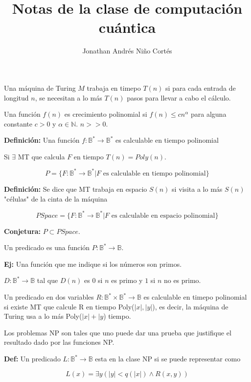 \documentclass[letter,twoside,12pt]{article}
\title{Notas de la clase de computación cuántica}
\author{Jonathan Andrés Niño Cortés}
\begin{document}
\maketitle

Una máquina de Turing $ M $ trabaja en timepo $ T(n) $ si para cada entrada de longitud $ n $, se necesitan a lo más $ T(n) $ pasos para llevar a cabo el cálculo.

Una función $ f(n) $ es crecimiento polinomial si $ f(n)  \leq cn^\alpha$ para alguna constante $ c > 0 $ y $ \alpha \in \mathbb{N} $. $ n>>0 $.

\textbf{Definición:} Una función $ f:\mathbb{B}^{*} \to \mathbb{B}^{*} $ es calculable en tiempo polinomial

Si $ \exists $ MT que calcula $ F $ en tiempo $ T(n) = Poly(n)$.

\begin{equation}
P = \{F:\mathbb{B}^*\to\mathbb{B}^*| F \text{ es calculable en tiempo polinomial} \}
\end{equation}

\textbf{Definición:} Se dice que MT trabaja en espacio $ S(n) $ si visita a lo más $ S(n) $ "células" de la cinta de la máquina

\begin{equation}
PSpace = \{F:\mathbb{B}^*\to\mathbb{B}^*| F \text{ es calculable en espacio polinomial} \}
\end{equation}

\textbf{Conjetura:} $ P \subset PSpace $.

Un predicado es una función $ P: \mathbb{B}^* \to \mathbb{B} $.

\textbf{Ej:} Una función que me indique si los números son primos.

$ D:\mathbb{B}^* \to \mathbb{B}$ tal que $ D(n) $ es 0 si $ n $ es primo y $ 1 $ si $ n $ no es primo.

Un predicado en dos variables $ R: \mathbb{B}^* \times \mathbb{B}^* \to \mathbb{B}$ es calculable en timepo polinomial si existe MT que calcule R en tiempo Poly($ |x|,|y| $), es decir, la máquina de Turing usa a lo más Poly($ |x|+|y $) tiempo.

Los problemas NP son tales que uno puede dar una prueba que justifique el resultado dado por las funciones NP.

\textbf{Def:} Un predicado $ L:\mathbb{B}^* \to \mathbb{B}$ esta en la clase NP si se puede representar como

\begin{equation}
L(x) = \exists y (|y| < q(|x|) \wedge R(x,y))
\end{equation}
\end{document}
